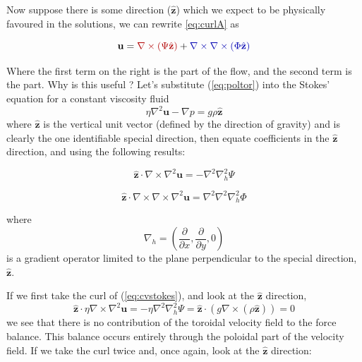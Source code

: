 \documentclass[10pt]{article}
\begin{document}
Now suppose there is some direction ($\hat{\mathbf{z}}$) which we expect to be physically favoured in the 
solutions, we can rewrite \ref{eq:curlA} as

\begin{equation}
	\mathbf{u} = \Red{\nabla \times(\Psi \hat{\mathbf{z}})} + 
                 \Blue{\nabla \times\nabla \times(\Phi \hat{\mathbf{z}})}
	\label{eq:poltor}
\end{equation}	

Where the first term on the right is the  part of the flow, and the second
term is the  part.	Why is this useful ?  Let's substitute 
(\ref{eq:poltor}) into the Stokes' equation for a constant viscosity fluid
\begin{equation}
	\eta \nabla^2 \mathbf{u} - \nabla p = g \rho \hat{\mathbf{z}} 
	\label{eq:cvstokes}
\end{equation}
where $\hat{\mathbf{z}}$ is the vertical unit vector (defined by the direction of gravity) and is clearly
the one identifiable special direction, then equate coefficients in the $\hat{\mathbf{z}}$ direction, and
using the following results:

\begin{equation}
	\hat{\mathbf{z}} \cdot \nabla \times \nabla^2 \mathbf{u} =
	 	- \nabla^2 \nabla_h^2\Psi
\end{equation}

\begin{equation}
	\hat{\mathbf{z}} \cdot \nabla \times \nabla \times \nabla^2 \mathbf{u} = 
		  \nabla^2 \nabla^2 \nabla_h^2\Phi
\end{equation}

where 
\begin{equation}
	\nabla_h = \left( \frac{\partial}{\partial x}, \frac{\partial}{\partial y}, 0 \right)
\end{equation}
is a gradient operator limited to the plane perpendicular to the special direction, $\hat{\mathbf{z}}$.		

If we first take the curl of (\ref{eq:cvstokes}), and look at the $\hat{\mathbf{z}}$ direction,
\begin{equation}
	\hat{\mathbf{z}} \cdot \eta \nabla \times \nabla^2 \mathbf{u} = 
	    -\eta \nabla^2 \nabla_h^2\Psi = 
		\hat{\mathbf{z}} \cdot \left( g \nabla \times \left( \rho \hat{\mathbf{z}}\right)\right) = 0
\end{equation}	
we see that there is no contribution of the toroidal velocity field to the force balance. 
This balance occurs entirely through the poloidal part of the velocity field. If we
take the curl twice and, once again, look at the $\hat{\mathbf{z}}$ direction:
\end{document}
